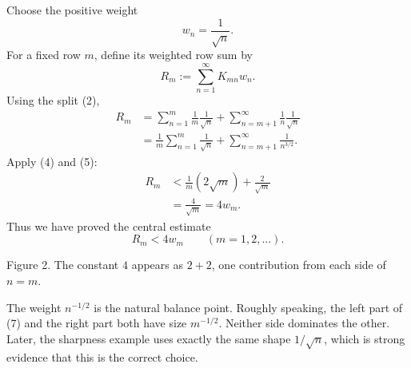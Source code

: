 \documentclass[11pt]{article}
\begin{document}
Choose the positive weight
\[
  \boxed{w_n=\frac1{\sqrt n}.}
  \tag{6}
\]
For a fixed row \(m\), define its weighted row sum by
\[
  R_m:=\sum_{n=1}^{\infty}K_{mn}w_n.
\]
Using the split (2),
\[
\begin{aligned}
 R_m
 &=\sum_{n=1}^{m}\frac1m\frac1{\sqrt n}
   +\sum_{n=m+1}^{\infty}\frac1n\frac1{\sqrt n}\\
 &=\frac1m\sum_{n=1}^{m}\frac1{\sqrt n}
   +\sum_{n=m+1}^{\infty}\frac1{n^{3/2}}.
\end{aligned}
\tag{7}
\]
Apply (4) and (5):
\[
\begin{aligned}
 R_m
 &<\frac1m(2\sqrt m)+\frac2{\sqrt m}\\
 &=\frac4{\sqrt m}=4w_m.
\end{aligned}
\]
Thus we have proved the central estimate
\[
  \boxed{R_m<4w_m\qquad(m=1,2,\ldots).}
  \tag{8}
\]

\begin{center}

\small Figure 2. The constant \(4\) appears as \(2+2\), one contribution from each side of \(n=m\).
\end{center}

\begin{extraBox}
The weight \(n^{-1/2}\) is the natural balance point. Roughly speaking, the left part of (7) and the right part both have size \(m^{-1/2}\). Neither side dominates the other. Later, the sharpness example uses exactly the same shape \(1/\sqrt n\), which is strong evidence that this is the correct choice.
\end{extraBox}
\end{document}

